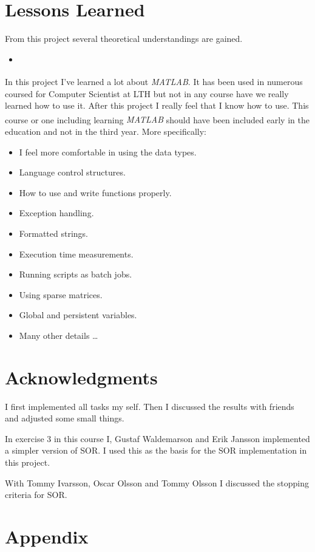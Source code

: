 \documentclass[10pt, a4paper]{article}
\newcommand{\matlab}{\small{\emph{MATLAB\textsuperscript{\textregistered}}}}
\begin{document}
\section{Lessons Learned}
From this project several theoretical understandings are gained.
\begin{itemize}
	\item  %
\end{itemize}

In this project I've learned a lot about \matlab{}. It has been used in numerous coursed for Computer Scientist at LTH but not in any course have we really learned how to use it. After this project I really feel that I know how to use. This course or one including learning \matlab{} should have been included early in the education and not in the third year. More specifically:

\begin{itemize}
	\item I feel more comfortable in using the data types.
	\item Language control structures.
	\item How to use and write functions properly.
	\item Exception handling.
	\item Formatted strings.
	\item Execution time measurements.
	\item Running scripts as batch jobs.
	\item Using sparse matrices.
	\item Global and persistent variables.
	\item Many other details \ldots
\end{itemize}


\section{Acknowledgments}
I first implemented all tasks my self. Then I discussed the results with friends and adjusted some small things.

In exercise 3 in this course I, Gustaf Waldemarson and Erik Jansson implemented a simpler version of SOR. I used this as the basis for the SOR implementation in this project.

With Tommy Ivarsson, Oscar Olsson and Tommy Olsson I discussed the stopping criteria for SOR.

{}


\newpage
\section*{Appendix}
\appendix
\end{document}
